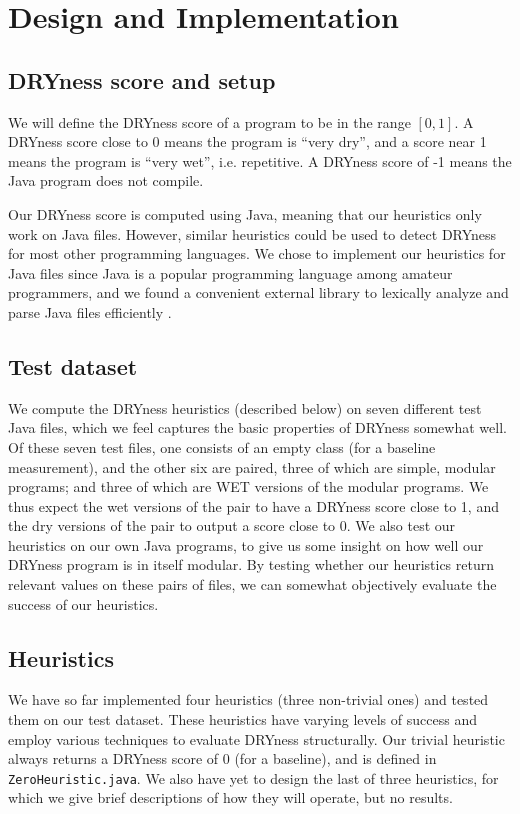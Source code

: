 \documentclass{article}
\begin{document}
\section{Design and Implementation}

\subsection{DRYness score and setup}

We will define the DRYness score of a program to be in the range $[0,1]$. A DRYness score close to 0 means the program is ``very dry'',
and a score near 1 means the program is ``very wet'', i.e. repetitive. A DRYness score of -1 means the Java program does not compile.

Our DRYness score is computed using Java, meaning that our heuristics only work on Java files. However, similar heuristics could 
be used to detect DRYness for most other programming languages. We chose to implement our heuristics for Java files since Java 
is a popular programming language among amateur programmers, and we found a convenient external library to lexically analyze and parse
Java files efficiently \cite{Javaparser}.

\subsection{Test dataset}

We compute the DRYness heuristics (described below) on seven different test Java files, which we feel captures the basic properties
of DRYness somewhat well. Of these seven test files, one consists of an empty class (for a baseline measurement), and the other six are paired,
three of which are simple, modular programs; and three of which are WET versions of the modular programs. We thus expect the wet versions of the pair to have a DRYness score close to 1, and the dry versions of the pair
to output a score close to 0. We also test our heuristics on our own Java programs, to give us some insight on how well our DRYness
program is in itself modular. By testing whether our heuristics return relevant values on these pairs of files,
we can somewhat objectively evaluate the success of our heuristics.

\subsection{Heuristics}

We have so far implemented four heuristics (three non-trivial ones) and tested them on our test dataset. These heuristics have varying levels of success
and employ various techniques to evaluate DRYness structurally. Our trivial heuristic always returns a DRYness score of 0 (for a
baseline), and is defined in \texttt{ZeroHeuristic.java}. We also have yet to design the last of three heuristics,
for which we give brief descriptions of how they will operate, but no results.
\end{document}

